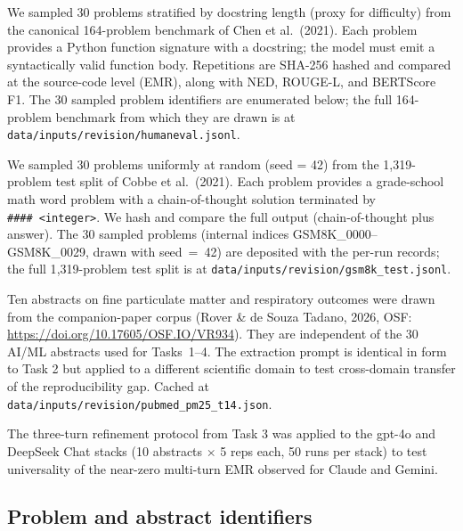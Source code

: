 \documentclass[11pt]{article}
\begin{document}
\begin{description}[leftmargin=*]
  \item[\textbf{HumanEval (code generation)}.] We sampled 30 problems stratified by docstring length (proxy for difficulty) from the canonical 164-problem benchmark of Chen et al.\ (2021). Each problem provides a Python function signature with a docstring; the model must emit a syntactically valid function body. Repetitions are SHA-256 hashed and compared at the source-code level (EMR), along with NED, ROUGE-L, and BERTScore F1. The 30 sampled problem identifiers are enumerated below; the full 164-problem benchmark from which they are drawn is at \texttt{data/inputs/revision/humaneval.jsonl}.
  \item[\textbf{GSM8K (math reasoning)}.] We sampled 30 problems uniformly at random (seed = 42) from the 1{,}319-problem test split of Cobbe et al.\ (2021). Each problem provides a grade-school math word problem with a chain-of-thought solution terminated by \texttt{\#\#\#\#\ <integer>}. We hash and compare the full output (chain-of-thought plus answer). The 30 sampled problems (internal indices GSM8K\_0000--GSM8K\_0029, drawn with seed~=~42) are deposited with the per-run records; the full 1{,}319-problem test split is at \texttt{data/inputs/revision/gsm8k\_test.jsonl}.
  \item[\textbf{PubMed PM\textsubscript{2.5}/respiratory health (out-of-AI/ML structured extraction)}.] Ten abstracts on fine particulate matter and respiratory outcomes were drawn from the companion-paper corpus (Rover \& de Souza Tadano, 2026, OSF: \url{https://doi.org/10.17605/OSF.IO/VR934}). They are independent of the 30 AI/ML abstracts used for Tasks~1--4. The extraction prompt is identical in form to Task 2 but applied to a different scientific domain to test cross-domain transfer of the reproducibility gap. Cached at \texttt{data/inputs/revision/pubmed\_pm25\_t14.json}.
  \item[\textbf{Multi-turn extension to gpt-4o and DeepSeek Chat}.] The three-turn refinement protocol from Task 3 was applied to the gpt-4o and DeepSeek Chat stacks (10 abstracts $\times$ 5 reps each, 50 runs per stack) to test universality of the near-zero multi-turn EMR observed for Claude and Gemini.
\end{description}

\subsection{Problem and abstract identifiers}
\end{document}

